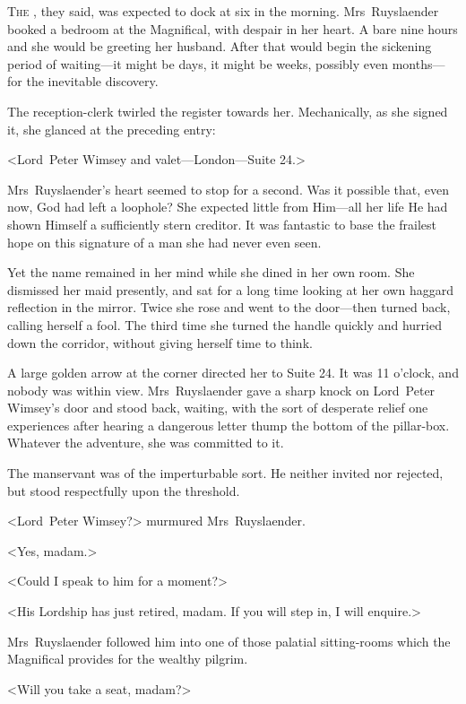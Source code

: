 
\lettrine{T}{he} , they said, was expected to dock at six in the morning. Mrs~Ruyslaender booked a bedroom at the Magnifical, with despair in her heart. A bare nine hours and she would be greeting her husband. After that would begin the sickening period of waiting—it might be days, it might be weeks, possibly even months—for the inevitable discovery.

The reception-clerk twirled the register towards her. Mechanically, as she signed it, she glanced at the preceding entry:

<Lord~Peter Wimsey and valet—London—Suite 24.>

Mrs~Ruyslaender's heart seemed to stop for a second. Was it possible that, even now, God had left a loophole? She expected little from Him—all her life He had shown Himself a sufficiently stern creditor. It was fantastic to base the frailest hope on this signature of a man she had never even seen.

Yet the name remained in her mind while she dined in her own room. She dismissed her maid presently, and sat for a long time looking at her own haggard reflection in the mirror. Twice she rose and went to the door—then turned back, calling herself a fool. The third time she turned the handle quickly and hurried down the corridor, without giving herself time to think.

A large golden arrow at the corner directed her to Suite 24. It was 11 o'clock, and nobody was within view. Mrs~Ruyslaender gave a sharp knock on Lord~Peter Wimsey's door and stood back, waiting, with the sort of desperate relief one experiences after hearing a dangerous letter thump the bottom of the pillar-box. Whatever the adventure, she was committed to it.

The manservant was of the imperturbable sort. He neither invited nor rejected, but stood respectfully upon the threshold.

<Lord~Peter Wimsey?> murmured Mrs~Ruyslaender.

<Yes, madam.>

<Could I speak to him for a moment?>

<His Lordship has just retired, madam. If you will step in, I will enquire.>

Mrs~Ruyslaender followed him into one of those palatial sitting-rooms which the Magnifical provides for the wealthy pilgrim.

<Will you take a seat, madam?>

